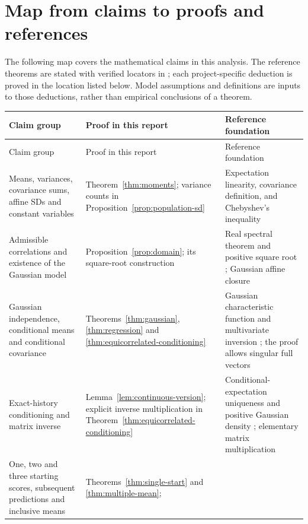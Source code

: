 


\chapter{Map from claims to proofs and references}
\label{sec:proof-map}
The following map covers the mathematical claims in this analysis. The
reference theorems are stated with verified locators in
; each project-specific deduction is proved
in the location listed below. Model assumptions and definitions are inputs
to those deductions, rather than empirical conclusions of a theorem.

\begin{longtable}{>{\raggedright\arraybackslash}p{}>{\raggedright\arraybackslash}p{}>{\raggedright\arraybackslash}p{}}
\hline
Claim group & Proof in this report & Reference foundation \\
\hline
\endfirsthead
\hline
Claim group & Proof in this report & Reference foundation \\
\hline
\endhead
\hline
\endfoot
Means, variances, covariance sums, affine SDs and constant variables &
Theorem~\ref{thm:moments}; variance counts in
Proposition~\ref{prop:population-sd} &
Expectation linearity, covariance definition, and Chebyshev's inequality
\citep{durrett2019,bertsekas2008} \\
\hline
Admissible correlations and existence of the Gaussian model &
Proposition~\ref{prop:domain}; its square-root construction &
Real spectral theorem and positive square root
\citep[Theorems 7.29 and 7.38]{axler2024}; Gaussian affine closure
\citep{gallager2013} \\
\hline
Gaussian independence, conditional means and conditional covariance &
Theorems~\ref{thm:gaussian}, \ref{thm:regression} and
\ref{thm:equicorrelated-conditioning} &
Gaussian characteristic function and multivariate inversion
\citep{gallager2013,durrett2019}; the proof allows singular full vectors \\
\hline
Exact-history conditioning and matrix inverse &
Lemma~\ref{lem:continuous-version}; explicit inverse multiplication in
Theorem~\ref{thm:equicorrelated-conditioning} &
Conditional-expectation uniqueness and positive Gaussian density
\citep{durrett2019,gallager2013}; elementary matrix multiplication \\
\hline
One, two and three starting scores, subsequent predictions and inclusive means &
Theorems~\ref{thm:single-start} and \ref{thm:multiple-mean};

\end{longtable}
